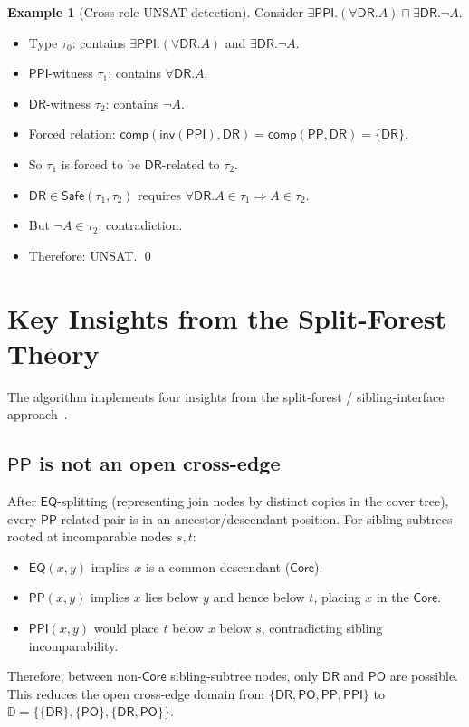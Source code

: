 \documentclass[a4paper,11pt]{article}
\theoremstyle{definition}
\newtheorem{example}[theorem]{Example}
\newcommand{\DR}{\ensuremath{\mathsf{DR}}}
\newcommand{\PO}{\ensuremath{\mathsf{PO}}}
\newcommand{\EQ}{\ensuremath{\mathsf{EQ}}}
\newcommand{\PP}{\ensuremath{\mathsf{PP}}}
\newcommand{\PPI}{\ensuremath{\mathsf{PPI}}}
\newcommand{\inv}{\ensuremath{\mathsf{inv}}}
\newcommand{\comp}{\ensuremath{\mathsf{comp}}}
\newcommand{\Safe}{\ensuremath{\mathsf{Safe}}}
\newcommand{\OpenDom}{\ensuremath{\mathbb{D}}}
\newcommand{\Core}{\ensuremath{\mathsf{Core}}}
\newcommand{\RCCrels}{\{\DR,\PO,\PP,\PPI\}}
\begin{document}
\begin{example}[Cross-role UNSAT detection]
\label{ex:cross-unsat}
Consider $\exists\PPI.(\forall\DR.A) \sqcap \exists\DR.\neg A$.
\begin{itemize}[nosep]
  \item Type $\tau_0$: contains $\exists\PPI.(\forall\DR.A)$ and
    $\exists\DR.\neg A$.
  \item $\PPI$-witness $\tau_1$: contains $\forall\DR.A$.
  \item $\DR$-witness $\tau_2$: contains $\neg A$.
  \item Forced relation:
    $\comp(\inv(\PPI), \DR) = \comp(\PP, \DR) = \{\DR\}$.
  \item So $\tau_1$ is forced to be $\DR$-related to $\tau_2$.
  \item $\DR \in \Safe(\tau_1, \tau_2)$ requires
    $\forall\DR.A \in \tau_1 \Rightarrow A \in \tau_2$.
  \item But $\neg A \in \tau_2$, contradiction.
  \item Therefore: UNSAT. \qed
\end{itemize}
\end{example}


\section{Key Insights from the Split-Forest Theory}
\label{sec:key-insights}

The algorithm implements four insights from the split-forest /
sibling-interface approach~\cite{SiblingCompleted,CoverTree}.

\subsection{$\PP$ is not an open cross-edge}

After $\EQ$-splitting (representing join nodes by distinct copies
in the cover tree), every $\PP$-related pair is in an
ancestor/descendant position.  For sibling subtrees rooted at
incomparable nodes $s, t$:
\begin{itemize}[nosep]
  \item $\EQ(x,y)$ implies $x$ is a common descendant ($\Core$).
  \item $\PP(x,y)$ implies $x$ lies below $y$ and hence below $t$,
    placing $x$ in the $\Core$.
  \item $\PPI(x,y)$ would place $t$ below $x$ below $s$,
    contradicting sibling incomparability.
\end{itemize}
Therefore, between non-$\Core$ sibling-subtree nodes, only $\DR$
and $\PO$ are possible.  This reduces the open cross-edge domain
from $\RCCrels$ to $\OpenDom = \{\{\DR\}, \{\PO\}, \{\DR,\PO\}\}$.
\end{document}
